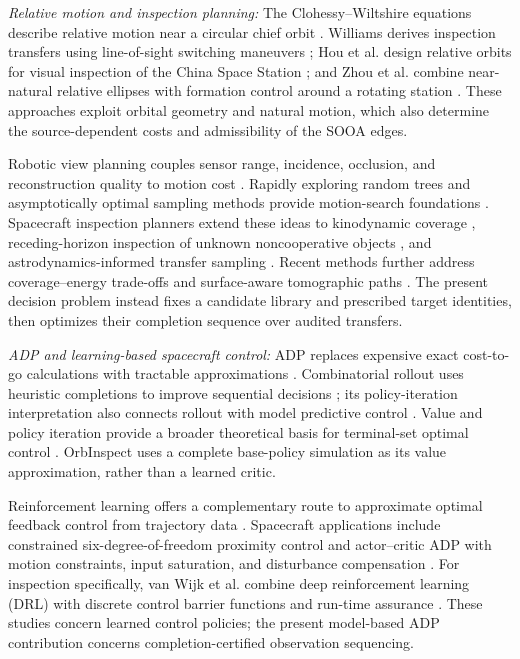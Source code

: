 \documentclass{IEEEtaes}
\theoremstyle{remark}
\theoremstyle{plain}
\begin{document}
\emph{Relative motion and inspection planning:} The Clohessy--Wiltshire equations describe relative motion near a circular chief orbit \cite{clohessy1960terminal,wertz2011space}. Williams derives inspection transfers using line-of-sight switching maneuvers \cite{williams2002inspection}; Hou et al. design relative orbits for visual inspection of the China Space Station \cite{hou2024relative}; and Zhou et al. combine near-natural relative ellipses with formation control around a rotating station \cite{zhou2026formation}. These approaches exploit orbital geometry and natural motion, which also determine the source-dependent costs and admissibility of the SOOA edges.

Robotic view planning couples sensor range, incidence, occlusion, and reconstruction quality to motion cost \cite{scott2003view}. Rapidly exploring random trees and asymptotically optimal sampling methods provide motion-search foundations \cite{lavalle1998rapidly,karaman2011sampling}. Spacecraft inspection planners extend these ideas to kinodynamic coverage \cite{faghihi2022kinodynamic,faghihi2023multiple}, receding-horizon inspection of unknown noncooperative objects \cite{maestrini2022guidance}, and astrodynamics-informed transfer sampling \cite{deka2023astrodynamics}. Recent methods further address coverage--energy trade-offs \cite{apodaca2025trajectory} and surface-aware tomographic paths \cite{zhou2026tomographic}. The present decision problem instead fixes a candidate library and prescribed target identities, then optimizes their completion sequence over audited transfers.

\emph{ADP and learning-based spacecraft control:} ADP replaces expensive exact cost-to-go calculations with tractable approximations \cite{bertsekas1996neuro,bertsekas2020rollout}. Combinatorial rollout uses heuristic completions to improve sequential decisions \cite{bertsekas1997combinatorial}; its policy-iteration interpretation also connects rollout with model predictive control \cite{bertsekas2005survey}. Value and policy iteration provide a broader theoretical basis for terminal-set optimal control \cite{bertsekas2017iterations}. OrbInspect uses a complete base-policy simulation as its value approximation, rather than a learned critic.

Reinforcement learning offers a complementary route to approximate optimal feedback control from trajectory data \cite{kiumarsi2018survey}. Spacecraft applications include constrained six-degree-of-freedom proximity control \cite{hu2021learning} and actor--critic ADP with motion constraints, input saturation, and disturbance compensation \cite{tian2024proximity}. For inspection specifically, van Wijk et al. combine deep reinforcement learning (DRL) with discrete control barrier functions and run-time assurance \cite{vanwijk2024inspection}. These studies concern learned control policies; the present model-based ADP contribution concerns completion-certified observation sequencing.
\end{document}
